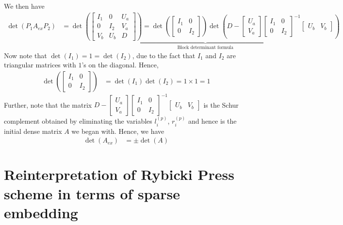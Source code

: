 \documentclass[final,leqno]{siamltex}
\begin{document}
We then have
\begin{align}
\det(P_1A_{ex}P_2) & =
\underbrace{
\det\left(
\begin{bmatrix}
I_1 & 0 & U_a\\
0 & I_2 & V_a\\
V_b & U_b & D
\end{bmatrix}
\right) =
\det\left(
\begin{bmatrix}
I_1 & 0\\
0 & I_2
\end{bmatrix}
\right)
\det\left(D-
\begin{bmatrix}
U_a\\
V_a
\end{bmatrix}
\begin{bmatrix}
I_1 & 0\\
0 & I_2
\end{bmatrix}^{-1}
\begin{bmatrix}
U_b & V_b
\end{bmatrix}
\right)
}_{\text{Block determinant formula}}
\end{align}
Now note that $\det(I_1) = 1 = \det(I_2)$, due to the fact that $I_1$ and $I_2$ are triangular matrices with $1$'s on the diagonal. Hence,
\begin{align}
\det\left(
\begin{bmatrix}
I_1 & 0\\
0 & I_2
\end{bmatrix}
\right) & = \det(I_1) \det(I_2) = 1 \times 1 = 1
\end{align}
Further, note that the matrix $D-
\begin{bmatrix}
U_a\\
V_a
\end{bmatrix}
\begin{bmatrix}
I_1 & 0\\
0 & I_2
\end{bmatrix}^{-1}
\begin{bmatrix}
U_b & V_b
\end{bmatrix}$ is the Schur complement obtained by eliminating the variables $l_i^{(p)}$, $r_i^{(p)}$ and hence is the initial dense matrix $A$ we began with. Hence, we have
\begin{align}
\det(A_{ex}) & = \pm \det(A)
\end{align}
\section{Reinterpretation of Rybicki Press scheme in terms of sparse embedding}
\end{document}
